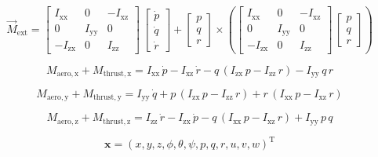\documentclass{article}
\begin{document}
\begin{dmath}
\overrightarrow{M}_{\mathrm{ext}}=\left[\begin{array}{ccc} I_{\mathrm{xx}} & 0 & -I_{\mathrm{xz}}\\ 0 & I_{\mathrm{yy}} & 0\\ -I_{\mathrm{zx}} & 0 & I_{\mathrm{zz}} \end{array}\right]\,\left[\begin{array}{c} \dot{p}\\ \dot{q}\\ \dot{r} \end{array}\right]+\left[\begin{array}{c} p\\ q\\ r \end{array}\right] \times \left(\left[\begin{array}{ccc} I_{\mathrm{xx}} & 0 & -I_{\mathrm{xz}}\\ 0 & I_{\mathrm{yy}} & 0\\ -I_{\mathrm{zx}} & 0 & I_{\mathrm{zz}} \end{array}\right]\,\left[\begin{array}{c} p\\ q\\ r \end{array}\right]\right)
\end{dmath}

\begin{dmath}
M_{\mathrm{aero,x}}+M_{\mathrm{thrust,x}}=I_{\mathrm{xx}}\,\dot{p}-I_{\mathrm{xz}}\,\dot{r}-q\,\left(I_{\mathrm{zx}}\,p-I_{\mathrm{zz}}\,r\right)-I_{\mathrm{yy}}\,q\,r
\end{dmath}

\begin{dmath}
M_{\mathrm{aero,y}}+M_{\mathrm{thrust,y}}=I_{\mathrm{yy}}\,\dot{q}+p\,\left(I_{\mathrm{zx}}\,p-I_{\mathrm{zz}}\,r\right)+r\,\left(I_{\mathrm{xx}}\,p-I_{\mathrm{xz}}\,r\right)
\end{dmath}

\begin{dmath}
M_{\mathrm{aero,z}}+M_{\mathrm{thrust,z}}=I_{\mathrm{zz}}\,\dot{r}-I_{\mathrm{zx}}\,\dot{p}-q\,\left(I_{\mathrm{xx}}\,p-I_{\mathrm{xz}}\,r\right)+I_{\mathrm{yy}}\,p\,q
\end{dmath}

\newpage

\begin{dmath}
\bm{x}=(x, y, z, \phi, \theta, \psi, p, q, r, u, v, w)^{\mathrm{T}}
\end{dmath}
\end{document}
